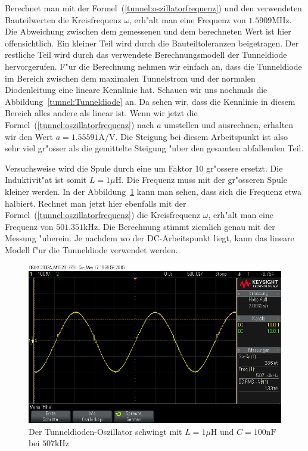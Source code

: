 \begin{refsection}
Berechnet man mit der Formel~(\ref{tunnel:oszillatorfrequenz}) und den verwendeten Bauteilwerten die Kreisfrequenz $\omega$, erh"alt man eine Frequenz von $1.5909\text{MHz}$.
Die Abweichung zwischen dem gemessenen und dem berechneten Wert ist hier offensichtlich.
Ein kleiner Teil wird durch die Bauteiltoleranzen beigetragen.
Der restliche Teil wird durch das verwendete Berechnungsmodell der Tunneldiode hervorgerufen.
F"ur die Berechnung nehmen wir einfach an, dass die Tunneldiode im Bereich zwischen dem maximalen Tunnelstrom und der normalen Diodenleitung eine lineare Kennlinie hat.
Schauen wir uns nochmals die Abbildung~\ref{tunnel:Tunneldiode} an.
Da sehen wir, dass die Kennlinie in diesem Bereich alles andere als linear ist.
Wenn wir jetzt die Formel~(\ref{tunnel:oszillatorfrequenz}) nach $a$ umstellen und ausrechnen, erhalten wir den Wert $a = 1.55591\text{A/V}$.
Die Steigung bei diesem Arbeitspunkt ist also sehr viel gr"osser als die gemittelte Steigung "uber den gesamten abfallenden Teil.

Versuchsweise wird die Spule durch eine um Faktor 10 gr"ossere ersetzt. 
Die Induktivit"at ist somit $L=1\mu\text{H}$. 
Die Frequenz muss mit der gr"osseren Spule kleiner werden. 
In der Abbildung~\ref{tunnel:oszi2} kann man sehen, dass sich die Frequenz etwa halbiert.
Rechnet man jetzt hier ebenfalls mit der Formel~(\ref{tunnel:oszillatorfrequenz}) die Kreisfrequenz $\omega$, erh"alt man eine Frequenz von $501.351\text{kHz}$.
Die Berechnung stimmt ziemlich genau mit der Messung "uberein.
Je nachdem wo der DC-Arbeitspunkt liegt, kann das lineare Modell f"ur die Tunneldiode verwendet werden.

\begin{figure}	%
\centering
\includegraphics[width=\hsize]{tunneldiode/images/Oszi_2.jpg}
\caption{Der Tunneldioden-Oszillator schwingt mit $L = 1\mu\text{H}$ und $C=100\text{nF}$ bei $507\text{kHz}$
\label{tunnel:oszi2}}
\end{figure}


\end{refsection}
